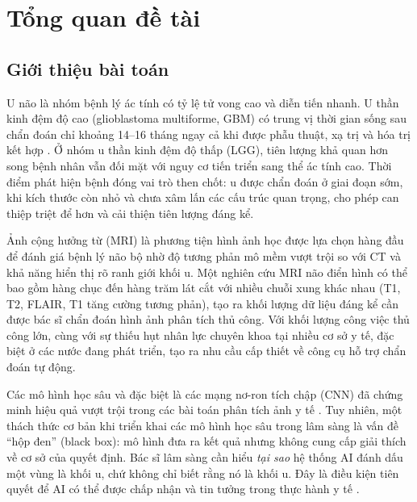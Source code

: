 
\chapter{Tổng quan đề tài}

\label{Chapter1}

\newcommand{\keyword}[1]{\textbf{#1}}
\newcommand{\tabhead}[1]{\textbf{#1}}
\newcommand{\code}[1]{\texttt{#1}}
\newcommand{\file}[1]{\texttt{\bfseries#1}}
\newcommand{\option}[1]{\texttt{\itshape#1}}


\section{Giới thiệu bài toán}

U não là nhóm bệnh lý ác tính có tỷ lệ tử vong cao và diễn tiến nhanh. U thần kinh đệm độ cao (glioblastoma multiforme, GBM) có trung vị thời gian sống sau chẩn đoán chỉ khoảng 14--16 tháng ngay cả khi được phẫu thuật, xạ trị và hóa trị kết hợp \cite{Menze2015}. Ở nhóm u thần kinh đệm độ thấp (LGG), tiên lượng khả quan hơn song bệnh nhân vẫn đối mặt với nguy cơ tiến triển sang thể ác tính cao. Thời điểm phát hiện bệnh đóng vai trò then chốt: u được chẩn đoán ở giai đoạn sớm, khi kích thước còn nhỏ và chưa xâm lấn các cấu trúc quan trọng, cho phép can thiệp triệt để hơn và cải thiện tiên lượng đáng kể.

Ảnh cộng hưởng từ (MRI) là phương tiện hình ảnh học được lựa chọn hàng đầu để đánh giá bệnh lý não bộ nhờ độ tương phản mô mềm vượt trội so với CT và khả năng hiển thị rõ ranh giới khối u. Một nghiên cứu MRI não điển hình có thể bao gồm hàng chục đến hàng trăm lát cắt với nhiều chuỗi xung khác nhau (T1, T2, FLAIR, T1 tăng cường tương phản), tạo ra khối lượng dữ liệu đáng kể cần được bác sĩ chẩn đoán hình ảnh phân tích thủ công. Với khối lượng công việc thủ công lớn, cùng với sự thiếu hụt nhân lực chuyên khoa tại nhiều cơ sở y tế, đặc biệt ở các nước đang phát triển, tạo ra nhu cầu cấp thiết về công cụ hỗ trợ chẩn đoán tự động.

Các mô hình học sâu và đặc biệt là các mạng nơ-ron tích chập (CNN) đã chứng minh hiệu quả vượt trội trong các bài toán phân tích ảnh y tế \cite{Litjens2017}. Tuy nhiên, một thách thức cơ bản khi triển khai các mô hình học sâu trong lâm sàng là vấn đề ``hộp đen'' (black box): mô hình đưa ra kết quả nhưng không cung cấp giải thích về cơ sở của quyết định. Bác sĩ lâm sàng cần hiểu \textit{tại sao} hệ thống AI đánh dấu một vùng là khối u, chứ không chỉ biết rằng nó là khối u. Đây là điều kiện tiên quyết để AI có thể được chấp nhận và tin tưởng trong thực hành y tế \cite{Doshi2017}.

